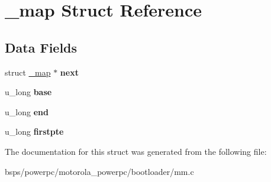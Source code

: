 \hypertarget{struct__map}{}\section{\+\_\+map Struct Reference}
\label{struct__map}
\subsection*{Data Fields}
\begin{DoxyCompactItemize}
\item 
\mbox{\label{struct__map_a15ebacf3cdbac4c264e9dda10c82211e}} 
struct \mbox{\hyperlink{struct__map}{\+\_\+map}} $\ast$ {\bfseries next}
\item 
\mbox{\label{struct__map_a075601696c258c7c39303b252df440c9}} 
u\+\_\+long {\bfseries base}
\item 
\mbox{\label{struct__map_a0adc5a911ce461a2c75726ceba2b743b}} 
u\+\_\+long {\bfseries end}
\item 
\mbox{\label{struct__map_ad271bb9d13360969b948b0c9bc913253}} 
u\+\_\+long {\bfseries firstpte}
\end{DoxyCompactItemize}


The documentation for this struct was generated from the following file\+:\begin{DoxyCompactItemize}
\item 
bsps/powerpc/motorola\+\_\+powerpc/bootloader/mm.\+c\end{DoxyCompactItemize}

